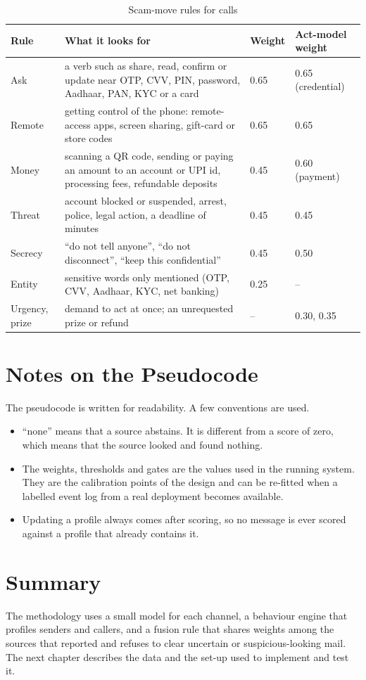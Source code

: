 {\begin{table}[H]
\caption{Scam-move rules for calls}
\label{tab:rules}
\centering\small{}
\begin{tabular}{|p{2.2cm}|p{8.6cm}|p{1.4cm}|p{1.6cm}|}
\hline
\textbf{Rule} & \textbf{What it looks for} & \textbf{Weight} & \textbf{Act-model weight} \\ \hline
Ask & a verb such as share, read, confirm or update near OTP, CVV, PIN, password, Aadhaar, PAN, KYC or a card & 0.65 & 0.65 (credential) \\ \hline
Remote & getting control of the phone: remote-access apps, screen sharing, gift-card or store codes & 0.65 & 0.65 \\ \hline
Money & scanning a QR code, sending or paying an amount to an account or UPI id, processing fees, refundable deposits & 0.45 & 0.60 (payment) \\ \hline
Threat & account blocked or suspended, arrest, police, legal action, a deadline of minutes & 0.45 & 0.45 \\ \hline
Secrecy & ``do not tell anyone'', ``do not disconnect'', ``keep this confidential'' & 0.45 & 0.50 \\ \hline
Entity & sensitive words only mentioned (OTP, CVV, Aadhaar, KYC, net banking) & 0.25 & -- \\ \hline
Urgency, prize & demand to act at once; an unrequested prize or refund & -- & 0.30, 0.35 \\ \hline
\end{tabular}
\end{table}

\section{Notes on the Pseudocode}
The pseudocode is written for readability. A few conventions are used.
\begin{itemize}
\item ``none'' means that a source abstains. It is different from a score of zero, which means that the source looked and found nothing.
\item The weights, thresholds and gates are the values used in the running system. They are the calibration points of the design and can be re-fitted when a labelled event log from a real deployment becomes available.
\item Updating a profile always comes after scoring, so no message is ever scored against a profile that already contains it.
\end{itemize}

\section{Summary}
The methodology uses a small model for each channel, a behaviour engine that profiles senders and callers, and a fusion rule that shares weights among the sources that reported and refuses to clear uncertain or suspicious-looking mail. The next chapter describes the data and the set-up used to implement and test it.

}
